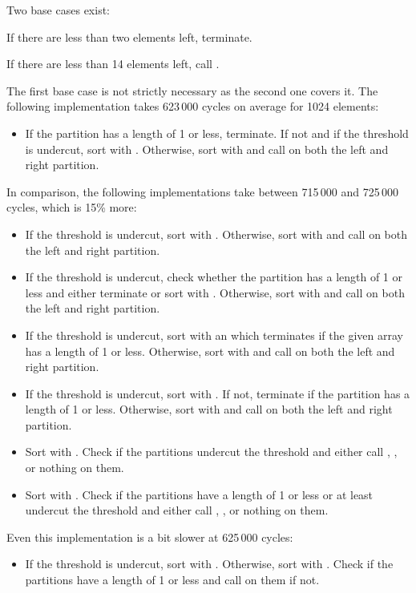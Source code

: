 Two base cases exist:
\begin{enumerate*}
	\item
	If there are less than two elements left, terminate.

	\item
	If there are less than 14 elements left, call \IS{}.
\end{enumerate*}
The first base case is not strictly necessary as the second one covers it.
The following implementation takes 623\,000 cycles on average for 1024 elements:
\begin{itemize}
	\item
	If the partition has a length of 1 or less, terminate.
	If not and if the threshold is undercut, sort with \IS{}.
	Otherwise, sort with \QS{} and call \QS{} on both the left and right partition.
\end{itemize}
In comparison, the following implementations take between 715\,000 and 725\,000 cycles, which is 15\% more:
\begin{itemize}
	\item
	If the threshold is undercut, sort with \IS{}.
	Otherwise, sort with \QS{} and call \QS{} on both the left and right partition.

	\item
	If the threshold is undercut, check whether the partition has a length of 1 or less and either terminate or sort with \IS{}.
	Otherwise, sort with \QS{} and call \QS{} on both the left and right partition.

	\item
	If the threshold is undercut, sort with an \IS{} which terminates if the given array has a length of 1 or less.
	Otherwise, sort with \QS{} and call \QS{} on both the left and right partition.

	\item
	If the threshold is undercut, sort with \IS{}.
	If not, terminate if the partition has a length of 1 or less.
	Otherwise, sort with \QS{} and call \QS{} on both the left and right partition.

	\item
	Sort with \QS{}.
	Check if the partitions undercut the threshold and either call \IS{}, \QS{}, or nothing on them.

	\item
	Sort with \QS{}.
	Check if the partitions have a length of 1 or less or at least undercut the threshold and either call \IS{}, \QS{}, or nothing on them.
\end{itemize}
Even this implementation is a bit slower at 625\,000 cycles:
\begin{itemize}
	\item
	If the threshold is undercut, sort with \IS{}.
	Otherwise, sort with \QS{}.
	Check if the partitions have a length of 1 or less and call \QS{} on them if not.
\end{itemize}


